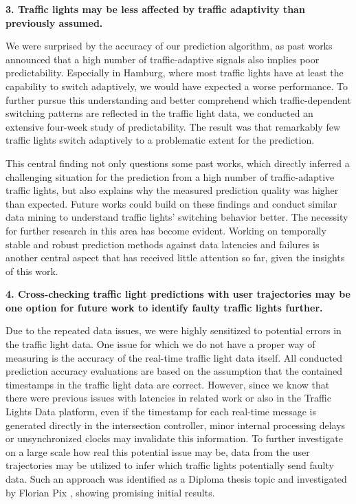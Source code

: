 \textbf{\color{cidarkblue}3. Traffic lights may be less affected by traffic adaptivity than previously assumed.} 

We were surprised by the accuracy of our prediction algorithm, as past works announced that a high number of traffic-adaptive signals also implies poor predictability. Especially in Hamburg, where most traffic lights have at least the capability to switch adaptively, we would have expected a worse performance. To further pursue this understanding and better comprehend which traffic-dependent switching patterns are reflected in the traffic light data, we conducted an extensive four-week study of predictability. The result was that remarkably few traffic lights switch adaptively to a problematic extent for the prediction. 

This central finding not only questions some past works, which directly inferred a challenging situation for the prediction from a high number of traffic-adaptive traffic lights, but also explains why the measured prediction quality was higher than expected. Future works could build on these findings and conduct similar data mining to understand traffic lights' switching behavior better. The necessity for further research in this area has become evident. Working on temporally stable and robust prediction methods against data latencies and failures is another central aspect that has received little attention so far, given the insights of this work.

\textbf{\color{cidarkblue}4. Cross-checking traffic light predictions with user trajectories may be one option for future work to identify faulty traffic lights further.} 

Due to the repeated data issues, we were highly sensitized to potential errors in the traffic light data. One issue for which we do not have a proper way of measuring is the accuracy of the real-time traffic light data itself. All conducted prediction accuracy evaluations are based on the assumption that the contained timestamps in the traffic light data are correct. However, since we know that there were previous issues with latencies in related work or also in the Traffic Lights Data platform, even if the timestamp for each real-time message is generated directly in the intersection controller, minor internal processing delays or unsynchronized clocks may invalidate this information. To further investigate on a large scale how real this potential issue may be, data from the user trajectories may be utilized to infer which traffic lights potentially send faulty data. Such an approach was identified as a Diploma thesis topic and investigated by Florian Pix \cite{pix_2024}, showing promising initial results.

